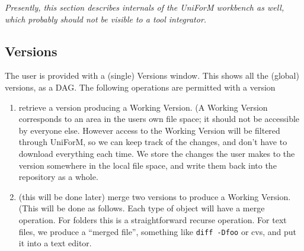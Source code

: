 \documentclass[a4paper]{article}
\begin{document}
\emph{Presently, this section describes internals of the UniForM
  workbench as well, which probably should not be visible to a tool
  integrator.}

\subsection{Versions} 

The user is provided with a (single) Versions window.  This shows all the 
(global) versions, as a DAG.  The following operations are 
permitted with a version
\begin{enumerate}
\item  retrieve a version producing a Working Version.
    (A Working Version corresponds to an area in the users own file space;
    it should not be accessible by everyone else.  However access to the
    Working Version will be filtered through UniForM, so we can keep track
    of the changes, and don't have to download everything each time.
      We store the changes the user makes to the version somewhere in
      the local file space, and write them back into the repository as 
      a whole. 
  \item (this will be done later) merge two versions to produce a
    Working Version.  (This will be done as follows.  Each type of
    object will have a merge operation.  For folders this is a
    straightforward recurse operation.  For text files, we produce a
    ``merged file'', something like \texttt{diff -Dfoo} or cvs, and
    put it into a text editor.
\end{enumerate}


\end{document}
